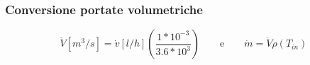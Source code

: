 \documentclass[a4paper,10pt]{article}                                                                                       %
\begin{document}
\subsubsection{Conversione portate volumetriche}                                                                            %
\label{subsubsec:ecf_conv}                                                                                                  %
\vspace{1mm}                                                                                                                %
\begin{equation}                                                                                                            %
  \label{eqn:conv}                                                                                                          %
  \dot{V}[m^3/s] = \dot{v}[l/h]\left(\frac{1*10^{-3}}{3.6*10^{3}}\right)                                                    %
  \qquad\text{e}\qquad                                                                                                      %
  \dot{m} = \dot{V}\rho(T_{in})                                                                                             %
\end{equation}                                                                                                              %
\end{document}
